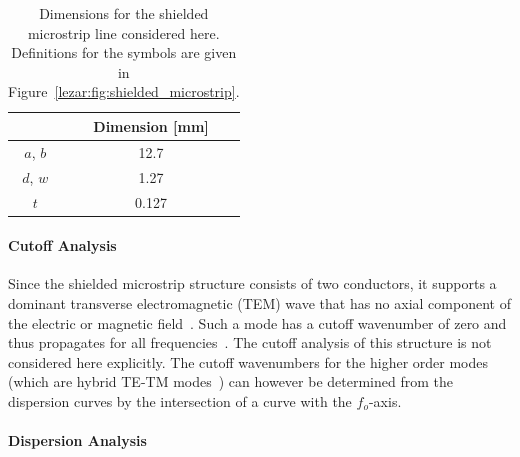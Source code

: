 \begin{table}[b]
 \centering
 \caption{Dimensions for the shielded microstrip line considered here. Definitions for the symbols are given in Figure~\ref{lezar:fig:shielded_microstrip}.}
 \label{lezar:tab:shielded_microstrip_dimensions}
 \begin{tabular}{|c|c|}
  \hline
   & Dimension [mm]\\
  \hline
   $a$, $b$ & 12.7\\
   $d$, $w$ & 1.27\\
   $t$ & 0.127\\
  \hline
 \end{tabular}
\end{table}

\paragraph{Cutoff Analysis}

Since the shielded microstrip structure consists of two conductors, it
supports a dominant transverse electromagnetic (TEM) wave that has no
axial component of the electric or magnetic field~\cite{Pozar2005}. Such
a mode has a cutoff wavenumber of zero and
thus propagates for all frequencies~\cite{Jin2002,PelCoc1998}. The
cutoff analysis of this structure is not considered here
explicitly. The cutoff wavenumbers for the higher order modes (which
are hybrid TE-TM modes~\cite{Pozar2005}) can however be determined from
the dispersion curves by the intersection of a curve with the
$f_o$-axis.

\paragraph{Dispersion Analysis}

